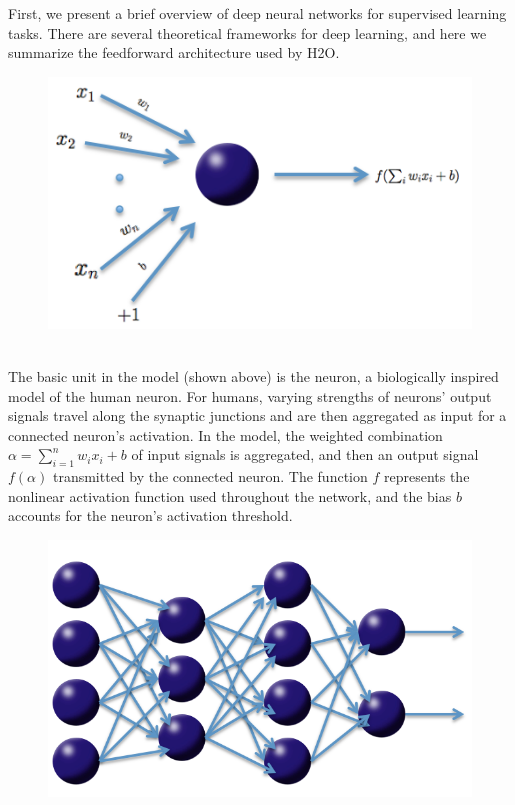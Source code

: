 \documentclass{article}[11pt]
\begin{document}
First, we present a brief overview of deep neural networks for supervised learning tasks. There are several theoretical frameworks for deep learning, and here we summarize the feedforward architecture used by H2O. 
\\
\begin{figure}[h]
\centering
\includegraphics[scale=0.5]{neuron.png}
\end{figure}
\\
\noindent
The basic unit in the model (shown above) is the neuron, a biologically inspired model of the human neuron. For humans, varying strengths of neurons' output signals travel along the synaptic junctions and are then aggregated  as input for a connected neuron's activation. In the model, the weighted combination $\alpha = \sum_{i=1}^{n} w_i x_i + b$ of input signals is aggregated, and then an output signal $f(\alpha)$ transmitted by the connected neuron. The function $f$ represents the nonlinear activation function used throughout the network, and the bias $b$ accounts for the neuron's activation threshold.
\\
\begin{figure}[h!]
\centering
\includegraphics[scale=0.3]{net.png}
\end{figure}
\end{document}
